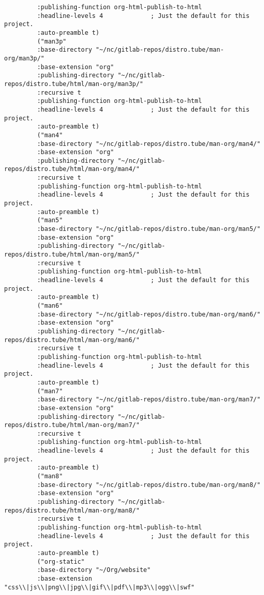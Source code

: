 \documentclass[11pt]{article}
\begin{document}
\begin{verbatim}
         :publishing-function org-html-publish-to-html
         :headline-levels 4             ; Just the default for this project.
         :auto-preamble t)
         ("man3p"
         :base-directory "~/nc/gitlab-repos/distro.tube/man-org/man3p/"
         :base-extension "org"
         :publishing-directory "~/nc/gitlab-repos/distro.tube/html/man-org/man3p/"
         :recursive t
         :publishing-function org-html-publish-to-html
         :headline-levels 4             ; Just the default for this project.
         :auto-preamble t)
         ("man4"
         :base-directory "~/nc/gitlab-repos/distro.tube/man-org/man4/"
         :base-extension "org"
         :publishing-directory "~/nc/gitlab-repos/distro.tube/html/man-org/man4/"
         :recursive t
         :publishing-function org-html-publish-to-html
         :headline-levels 4             ; Just the default for this project.
         :auto-preamble t)
         ("man5"
         :base-directory "~/nc/gitlab-repos/distro.tube/man-org/man5/"
         :base-extension "org"
         :publishing-directory "~/nc/gitlab-repos/distro.tube/html/man-org/man5/"
         :recursive t
         :publishing-function org-html-publish-to-html
         :headline-levels 4             ; Just the default for this project.
         :auto-preamble t)
         ("man6"
         :base-directory "~/nc/gitlab-repos/distro.tube/man-org/man6/"
         :base-extension "org"
         :publishing-directory "~/nc/gitlab-repos/distro.tube/html/man-org/man6/"
         :recursive t
         :publishing-function org-html-publish-to-html
         :headline-levels 4             ; Just the default for this project.
         :auto-preamble t)
         ("man7"
         :base-directory "~/nc/gitlab-repos/distro.tube/man-org/man7/"
         :base-extension "org"
         :publishing-directory "~/nc/gitlab-repos/distro.tube/html/man-org/man7/"
         :recursive t
         :publishing-function org-html-publish-to-html
         :headline-levels 4             ; Just the default for this project.
         :auto-preamble t)
         ("man8"
         :base-directory "~/nc/gitlab-repos/distro.tube/man-org/man8/"
         :base-extension "org"
         :publishing-directory "~/nc/gitlab-repos/distro.tube/html/man-org/man8/"
         :recursive t
         :publishing-function org-html-publish-to-html
         :headline-levels 4             ; Just the default for this project.
         :auto-preamble t)
         ("org-static"
         :base-directory "~/Org/website"
         :base-extension "css\\|js\\|png\\|jpg\\|gif\\|pdf\\|mp3\\|ogg\\|swf"

\end{verbatim}
\end{document}
